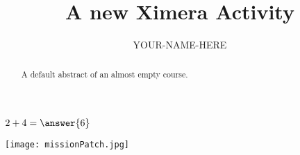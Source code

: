 \documentclass{ximera}
\title{A new Ximera Activity}
\author{YOUR-NAME-HERE}
\begin{document}
\begin{abstract}
    A default abstract of an almost empty course.
\end{abstract}
\maketitle


\begin{exercise}
    $2+4=\answer{6}$
\end{exercise}

\begin{center} %
\texttt{[image: missionPatch.jpg]}
\end{center}
\end{document}
